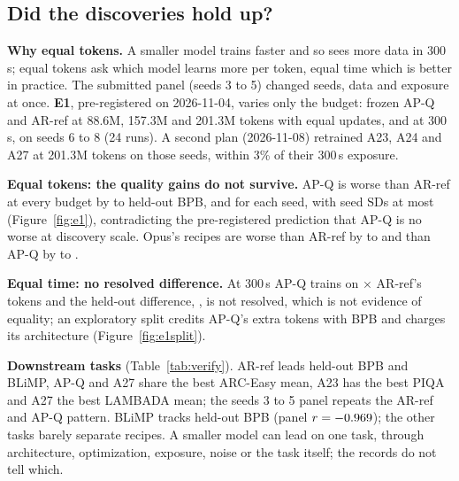 \documentclass{article}
\begin{document}
\subsection{Did the discoveries hold up?}\label{sec:verify}
 \textbf{Why equal tokens.} A smaller model trains faster and so sees more data in 300\,s; equal tokens ask which model learns more per token, equal time which is better in practice. The submitted panel (seeds 3 to 5) changed seeds, data and exposure at once. \textbf{E1}, pre-registered on 2026-11-04, varies only the budget: frozen AP-Q and AR-ref at 88.6M, 157.3M and 201.3M tokens with equal updates, and at 300\,s, on seeds 6 to 8 (24 runs). A second plan (2026-11-08) retrained A23, A24 and A27 at 201.3M tokens on those seeds, within 3\% of their 300\,s exposure.

\begin{table}[t]
\caption{Held-out BPB and zero-shot accuracy (\%) at 201.3M training tokens on shared seeds 6 to 8 (means). Bold: best. Accuracy seed SDs reach \CREightBenchSDMax{} points, so leaders are observed means, not rankings. All recipes and the seeds 3 to 5 panel: Table~\ref{tab:bench}.}\label{tab:verify}
\centering\footnotesize\setlength{\tabcolsep}{4.5pt}
\end{table}

 \textbf{Equal tokens: the quality gains do not survive.} AP-Q is worse than AR-ref at every budget by \CREOneMatchedLoAbs{} to \CREOneMatchedHiAbs{} held-out BPB, and for each seed, with seed SDs at most \CREOneMaxSD{} (Figure~\ref{fig:e1}), contradicting the pre-registered prediction that AP-Q is no worse at discovery scale. Opus's recipes are worse than AR-ref by \CRMTDLoAbs{} to \CRMTDHiAbs{} and than AP-Q by \CRFiveMTDAPLoAbs{} to \CRFiveMTDAPHiAbs.

 \textbf{Equal time: no resolved difference.} At 300\,s AP-Q trains on \CREOneTokRatio$\times$ AR-ref's tokens and the held-out difference, \CREOneTimeHeldThree{} \CREOneTimeHeldCI, is not resolved, which is not evidence of equality; an exploratory split credits AP-Q's extra tokens with \CREOneExposure{} BPB and charges its architecture \CREOneArch{} (Figure~\ref{fig:e1split}).

 \textbf{Downstream tasks} (Table~\ref{tab:verify}). AR-ref leads held-out BPB and BLiMP, AP-Q and A27 share the best ARC-Easy mean, A23 has the best PIQA and A27 the best LAMBADA mean; the seeds 3 to 5 panel repeats the AR-ref and AP-Q pattern. BLiMP tracks held-out BPB (panel $r=-0.969$); the other tasks barely separate recipes. A smaller model can lead on one task, through architecture, optimization, exposure, noise or the task itself; the records do not tell which.
\end{document}
